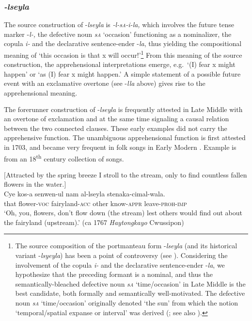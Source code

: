\documentclass[output=paper,colorlinks,citecolor=brown]{langscibook}
\begin{document}
\subsubsection{\textit{-lseyla}} 
The source construction of \nobreakdash-\textit{lseyla} is \textit{-l-s\textsc{a}-i-la,} which involves the future tense marker \nobreakdash-\textit{l-,} the defective noun \textit{s\textsc{a}} `occasion' functioning as a nominalizer, the copula \textit{i-} and the declarative sentence-ender \nobreakdash-\textit{la}, thus yielding the compositional meaning of `this occasion is that x will occur!'\footnote{The source composition of the portmanteau form \nobreakdash-\textit{lseyla} (and its historical variant \nobreakdash-\textit{lsyeyla}) has been a point of controversy (see \citealt[137--138]{Jang2002}). Considering the involvement of the copula \textit{i-} and the declarative sentence-ender \nobreakdash-\textit{la}, we hypothesize that the preceding formant is a nominal, and thus the semantically-bleached defective noun \textit{s\textsc{a}} `time/occasion' in Late Middle  is the best candidate, both formally and semantically well-motivated. The defective noun \textit{s\textsc{a}} `time/occasion' originally denoted `the sun' from which the notion `temporal/spatial expanse or interval' was derived (\citealt[61]{Jeong2003}; see also \citealt{RheeKoo2021}).} From this meaning of the source construction, the apprehensional interpretations emerge, e.g.\  `(I) fear x might happen' or `as (I) fear x might happen.' A simple statement of a possible future event with an exclamative overtone (see \nobreakdash-\textit{lla} above) gives rise to the apprehensional meaning. 

The forerunner construction of \nobreakdash-\textit{lseyla} is frequently attested in Late Middle  with an overtone of exclamation and at the same time signaling a causal relation between the two connected clauses. These early examples did not carry the apprehensive function. The unambiguous apprehensional function is first attested in 1703, and became very frequent in folk songs in Early Modern . Example  is from an 18\textsuperscript{th} century collection of songs.


\ea \label{ex:RK11} \textnormal{$[$Attracted by the spring breeze I stroll to the stream, only to find countless fallen flowers in the water.$]$} \\
\gll Cye kos-a senwen-ul nam al-lseyla stenaka-cimal-wala. \\
that flower-\textsc{voc} fairyland-\textsc{acc} other know-\textsc{appr} leave-\textsc{proh-imp} \\
\glt `Oh, you, flowers, don't flow down (the stream) lest others would find out about the fairyland (upstream).' (ca 1767 \textit{Haytongkayo} Cwussipon)
\z
\end{document}
